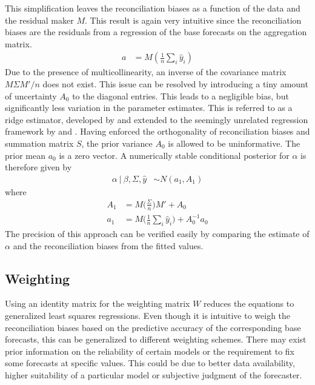 \documentclass[a4paper,fleqn,11pt]{article}
\begin{document}
This simplification leaves the reconciliation biases as a function of the data and the residual maker $M$. This result is again very intuitive since the reconciliation biases are the residuals from a regression of the base forecasts on the aggregation matrix.
\begin{align}
a &= M\left(\frac{1}{n}\sum_i \hat{y}_i\right)
\end{align}
Due to the presence of multicollinearity, an inverse of the covariance matrix $M\Sigma M'/n$ does not exist. This issue can be resolved by introducing a tiny amount of uncertainty $A_0$  to the diagonal entries. This leads to a negligible bias, but significantly less variation in the parameter estimates. This is referred to as a ridge estimator, developed by \cite{Brown1980} and extended to the seemingly unrelated regression framework by \cite{Haitovsky1987} and \cite{Firinguetti1997}. Having enforced the orthogonality of reconciliation biases and summation matrix $S$, the prior variance $A_0$ is allowed to be uninformative. The prior mean $a_0$ is a zero vector. A numerically stable conditional posterior for $\alpha$ is therefore given by
\begin{align}
	\label{eq:alpha}
	\alpha\ |\ \beta,\Sigma,\hat{y} &\sim N(a_1,A_1)
\end{align}
where
\begin{align*}
	A_1 &= M\Bigg(\frac{\Sigma}{n}\Bigg)M' + A_0\\
	a_1 &= M\Bigg(\frac{1}{n}\sum_i \hat{y}_i\Bigg) + A_0^{-1}a_0
\end{align*}
The precision of this approach can be verified easily by comparing the estimate of $\alpha$ and the reconciliation biases from the fitted values. \\


\subsection{Weighting}
\label{sec:weighting}
Using an identity matrix for the weighting matrix $W$ reduces the equations to generalized least squares regressions. Even though it is intuitive to weigh the reconciliation biases based on the predictive accuracy of the corresponding base forecasts, this can be generalized to different weighting schemes. There may exist prior information on the reliability of certain models or the requirement to fix some forecasts at specific values. This could be due to better data availability, higher suitability of a particular model or subjective judgment of the forecaster.
\end{document}
